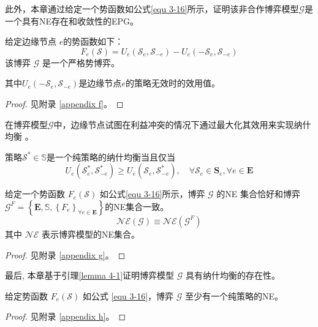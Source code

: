 此外，本章通过给定一个势函数如公式\ref{equ 3-16}所示，证明该非合作博弈模型$\mathcal{G}$是一个具有NE存在和收敛性的EPG。
\begin{theorem}
给定边缘节点 $e$的势函数如下：
\begin{equation}
	{F}_{e}\left(\mathcal{S}\right) = {U}_{e}\left(\mathcal{S}_{e}, \mathcal{S}_{-e}\right) - {U}_{e}\left(-\mathcal{S}_{e}, \mathcal{S}_{-e}\right)
	\label{equ 3-16}
\end{equation}
该博弈 $\mathcal{G}$ 是一个严格势博弈。
\label{theorem 4-1}
\end{theorem}
\noindent 其中${U}_{e}\left(-\mathcal{S}_{e}, \mathcal{S}_{-e}\right)$是边缘节点$e$的策略无效时的效用值。
\begin{proof} 见附录 \ref{appendix f}。
\end{proof}
\noindent 在博弈模型$\mathcal{G}$中，边缘节点试图在利益冲突的情况下通过最大化其效用来实现纳什均衡 \cite{chew2016potential}。
\begin{definition}
策略$\mathcal{S}^{*} \in \mathbb{S}$是一个纯策略的纳什均衡\cite{chew2016potential}当且仅当
	\begin{equation}
		U_{e}\left(\mathcal{S}_{e}^{*}, \mathcal{S}_{-e}^{*}\right) \geq U_{e}\left(\mathcal{S}_{e}, \mathcal{S}_{-e}^{*}\right), \quad \forall \mathcal{S}_{e} \in \mathbf{S}_{e}, \forall e \in \mathbf{E}
	\end{equation}
\end{definition}
\begin{lemma}
	给定一个势函数 $F_{e}(\mathcal{S})$ 如公式\ref{equ 3-16}所示，博弈 $\mathcal{G}$ 的NE 集合恰好和博弈$\mathcal{G}^{F}=\left\{\mathbf{E}, \mathbb{S}, \left\{{F}_{e}\right\}_{\forall e \in \mathbf{E}} \right\}$的NE集合一致。
	\begin{equation}
		\mathcal{NE}(\mathcal{G}) \equiv \mathcal{NE}\left(\mathcal{G}^{F}\right)
	\end{equation}
	其中 $\mathcal{NE}$ 表示博弈模型的NE集合。
\label{lemma 4-1}
\end{lemma}
\begin{proof} 见附录 \ref{appendix g}。
\end{proof}
\noindent 最后, 本章基于引理\ref{lemma 4-1}证明博弈模型 $\mathcal{G}$ 具有纳什均衡的存在性。
\begin{theorem}
	给定势函数 $F_{e}(\mathcal{S})$ 如公式 \ref{equ 3-16}，博弈 $\mathcal{G}$ 至少有一个纯策略的NE。
\label{theorem 4-2}
\end{theorem}
\begin{proof} 见附录 \ref{appendix h}。
\end{proof}
